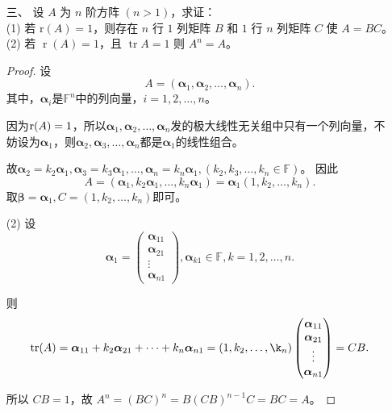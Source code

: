\begin{enumerate}[1~]
\item[三、]
设 $A$ 为 $n$ 阶方阵 $(n > 1)$，求证：\\
(1) 若 r$(A) = 1$，则存在 $n$ 行 $1$ 列矩阵 $B$ 和 $1$ 行 $n$ 列矩阵 $C$ 使 $A = BC$。\\
(2) 若 $\operatorname{r}(A) = 1$，且 $\operatorname{tr}A = 1$ 则 $A^n = A$。
\begin{proof}
设$$
A = (\boldsymbol{\alpha}_1, \boldsymbol{\alpha}_2, \dots, \boldsymbol{\alpha}_n).$$
其中，$\boldsymbol{\alpha}_i$是$\mathbb{F}^n$中的列向量，$i = 1, 2, \dots, n$。

因为${\rm r}(A) = 1$，所以$\boldsymbol{\alpha}_1, \boldsymbol{\alpha}_2, \dots, \boldsymbol{\alpha}_n$发的极大线性无关组中只有一个列向量，不妨设为$\boldsymbol{\alpha}_1$，则$\boldsymbol{\alpha}_2, \boldsymbol{\alpha}_3, \dots, \boldsymbol{\alpha}_n$都是$\boldsymbol{\alpha}_1$的线性组合。

故$\boldsymbol{\alpha}_2 = k_2 \boldsymbol{\alpha}_1, \boldsymbol{\alpha}_3 = k_3 \boldsymbol{\alpha}_1, \dots, \boldsymbol{\alpha}_n = k_n \boldsymbol{\alpha}_1, (k_2, k_3, \dots, k_n \in \mathbb{F})$。
因此\[
A = (\boldsymbol{\alpha}_1, k_2 \boldsymbol{\alpha}_1, \dots, k_n \boldsymbol{\alpha}_1) = \boldsymbol{\alpha}_1 (1, k_2, \dots, k_n).
\]
取$\boldsymbol{\beta} = \boldsymbol{\alpha}_1, C = (1, k_2, \dots, k_n)$即可。

(2) 设
$$
\boldsymbol{\alpha}_1 = \left( \begin{matrix}
\boldsymbol{\alpha}_{11}\\
\boldsymbol{\alpha}_{21}\\
\vdots\\
\boldsymbol{\alpha}_{n1} \end{matrix} \right), \boldsymbol{\alpha}_{k1} \in \mathbb{F}, k = 1, 2, \dots, n.
$$

则\begin{align*}
{\rm tr}(A) = \boldsymbol{\alpha}_{11} +k_2 \boldsymbol{\alpha}_{21}+ \cdots +k_n\boldsymbol{\alpha}_{n1}
=(1, k_2, \dots, \k_n) \left( \begin{matrix}
\boldsymbol{\alpha}_{11}\\
\boldsymbol{\alpha}_{21}\\
\vdots \\
\boldsymbol{\alpha}_{n1}\\
\end{matrix} \right)
=CB.
\end{align*}

所以 $CB=1$，故 $A^n=(BC)^n=B(CB)^{n-1}C=BC=A$。
\end{proof}


\end{enumerate}
